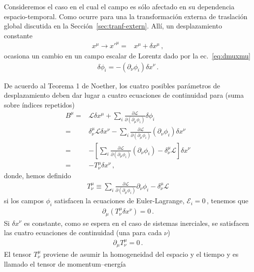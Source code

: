 \begin{frame}
  Consideremos el caso en el cual el campo es sólo afectado en su dependencia espacio-temporal. Como ocurre para una la transformación externa de traslación global
  discutida en la Sección~\ref{sec:tranf-extern}. Allí, un desplazamiento constante
\begin{align}
  x^\mu\to{x'}^\mu=&x^\mu+\delta x^{\mu}\,,
\end{align}
ocasiona un cambio en
  un campo escalar de Lorentz dado por la ec.~\eqref{eq:dmuxmu}
  \begin{align}
    \delta\phi_{i}=-\left( \partial_{\nu}\phi_i \right)\delta x^{\nu}\,.
  \end{align}

  De acuerdo al Teorema 1 de Noether, los cuatro posibles parámetros de desplazamiento deben dar lugar a cuatro ecuaciones de continuidad para (suma sobre índices repetidos)
\begin{align}
     B^{\mu}=& \mathcal{L} \delta x^{\mu} +\sum_i \frac{\partial\mathcal{L}}{\partial(\partial_{\mu}\phi_i)}\delta\phi_{i} \nonumber\\
  =&\delta_{\nu}^{\mu} \mathcal{L} \delta x^{\nu} -\sum_i \frac{\partial\mathcal{L}}{\partial(\partial_{\mu}\phi_i)} \left( \partial_{\nu}\phi_i \right)\delta x^{\nu}   \nonumber\\
  =&- \left[\sum_i\frac{\partial\mathcal{L}}{\partial(\partial_{\mu}\phi_i)} \left( \partial_{\nu}\phi_i \right) - \delta_{\nu}^{\mu} \mathcal{L} \right] \delta x^{\nu}   \nonumber\\
  =&    - T^{\mu}_{\nu} \delta x^{\nu}\,,
\end{align}
donde, hemos definido
\begin{align}
  T^{\mu}_{\nu}\equiv\sum_i \frac{\partial\mathcal{L}}{\partial(\partial_{\mu}\phi_i)}\partial_{\nu}\phi_i-\delta^{\mu}_{\nu}\mathcal{L}
\end{align}
si los campos $\phi_{i}$ satisfacen la ecuaciones de Euler-Lagrange, $\mathcal{E}_i=0\,$, tenemos que
\begin{align}
  \partial_{\mu} \left( T^{\mu}_{\nu} \delta x^{\nu}\right)=0\,.
\end{align}
Si $\delta x^{\nu}$ es constante, como se espera en el caso de sistemas inerciales, se satisfacen las cuatro  ecuaciones de continuidad (una para cada $\nu$)
\begin{align}
  \partial_{\mu} T^{\mu}_{\nu}=0\,.
\end{align}
El tensor $T^\mu_\nu$ proviene de asumir la homogeneidad del espacio y el tiempo y es llamado el tensor de momentum--energía \cite{1605.01121}
\end{frame}

